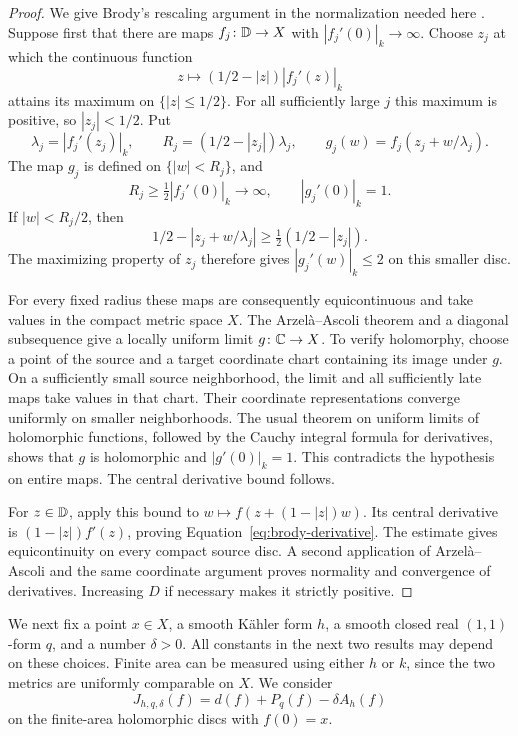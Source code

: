\begin{proof}
We give Brody's rescaling argument in the normalization needed here
\cite{Brody1978}.
Suppose first that there are maps $f_j\colon\mathbb D\to X$ with
$|f_j'(0)|_k\to\infty$. Choose $z_j$ at which the continuous function
\[
 z\longmapsto (1/2-|z|)|f_j'(z)|_k
\]
attains its maximum on $\{|z|\leq1/2\}$. For all sufficiently large $j$
this maximum is positive, so $|z_j|<1/2$. Put
\[
 \lambda_j=|f_j'(z_j)|_k,
 \qquad R_j=(1/2-|z_j|)\lambda_j,
 \qquad g_j(w)=f_j(z_j+w/\lambda_j).
\]
The map $g_j$ is defined on $\{|w|<R_j\}$, and
\[
 R_j\geq\tfrac12|f_j'(0)|_k\longrightarrow\infty,
 \qquad |g_j'(0)|_k=1.
\]
If $|w|<R_j/2$, then
\[
 1/2-|z_j+w/\lambda_j|
 \geq\tfrac12(1/2-|z_j|).
\]
The maximizing property of $z_j$ therefore gives
$|g_j'(w)|_k\leq2$ on this smaller disc.

For every fixed radius these maps are consequently equicontinuous and
take values in the compact metric space $X$. The Arzel\`a--Ascoli theorem
and a diagonal subsequence give a locally uniform limit
$g\colon\mathbb C\to X$. To verify holomorphy, choose a point of the source and
a target coordinate chart containing its image under $g$. On a
sufficiently small source neighborhood, the limit and all sufficiently
late maps take values in that chart. Their coordinate representations
converge uniformly on smaller neighborhoods. The usual theorem on
uniform limits of holomorphic functions, followed by the Cauchy
integral formula for derivatives, shows that $g$ is holomorphic and
$|g'(0)|_k=1$. This contradicts the hypothesis on entire maps. The
central derivative bound follows.

For $z\in\mathbb D$, apply this bound to
$w\mapsto f(z+(1-|z|)w)$. Its central derivative is
$(1-|z|)f'(z)$, proving Equation~\eqref{eq:brody-derivative}. The estimate gives
equicontinuity on every compact source disc. A second application of
Arzel\`a--Ascoli and the same coordinate argument proves normality and
convergence of derivatives. Increasing $D$ if necessary makes it
strictly positive.
\end{proof}

We next fix a point $x\in X$, a smooth K\"ahler form $h$, a smooth
closed real $(1,1)$-form $q$, and a number $\delta>0$. All constants in
the next two results may depend on these choices. Finite area can be
measured using either $h$ or $k$, since the two metrics are uniformly
comparable on $X$. We consider
\begin{equation}
 J_{h,q,\delta}(f)=d(f)+P_q(f)-\delta A_h(f)
 \label{eq:disc-functional}
\end{equation}
on the finite-area holomorphic discs with $f(0)=x$.

